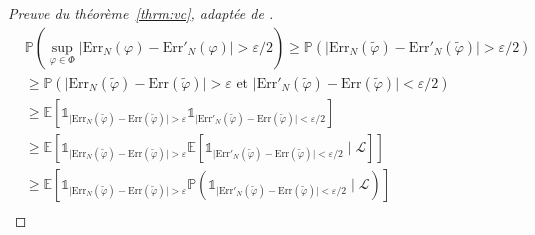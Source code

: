 \begin{proof}[Preuve du théorème~\ref{thrm:vc}, adaptée de \citet{Devroye1997}]
    \begin{align*}
        &\mathbb{P} \left( \sup_{\varphi \in \Phi} \vert \mathrm{Err}_N ( \varphi ) - \mathrm{Err}'_N (\varphi) \vert > \varepsilon/2 \right) \geq \mathbb{P} \left( \vert \mathrm{Err}_N ( \tilde{\varphi} ) - \mathrm{Err}'_N (\tilde{\varphi}) \vert > \varepsilon/2 \right) \\
        &\geq \mathbb{P} \left( \vert \mathrm{Err}_N ( \tilde{\varphi} ) - \mathrm{Err} (\tilde{\varphi}) \vert > \varepsilon \text{ et } \vert \mathrm{Err}'_N ( \tilde{\varphi} ) - \mathrm{Err} (\tilde{\varphi}) \vert < \varepsilon/2 \right) \\
        &\geq \mathbb{E} \left[ \mathds{1}_{\vert \mathrm{Err}_N ( \tilde{\varphi} ) - \mathrm{Err} (\tilde{\varphi}) \vert > \varepsilon} \mathds{1}_{\vert \mathrm{Err}'_N ( \tilde{\varphi} ) - \mathrm{Err} (\tilde{\varphi}) \vert < \varepsilon/2} \right] \\
        &\geq \mathbb{E} \left[ \mathds{1}_{\vert \mathrm{Err}_N ( \tilde{\varphi} ) - \mathrm{Err} (\tilde{\varphi}) \vert > \varepsilon} \mathbb{E} \left[ \mathds{1}_{\vert \mathrm{Err}'_N ( \tilde{\varphi} ) - \mathrm{Err} (\tilde{\varphi}) \vert < \varepsilon/2} \mid \mathcal{L} \right] \right] \\
        &\geq \mathbb{E} \left[ \mathds{1}_{\vert \mathrm{Err}_N ( \tilde{\varphi} ) - \mathrm{Err} (\tilde{\varphi}) \vert > \varepsilon} \mathbb{P} \left( \mathds{1}_{\vert \mathrm{Err}'_N ( \tilde{\varphi} ) - \mathrm{Err} (\tilde{\varphi}) \vert < \varepsilon/2} \mid \mathcal{L} \right) \right] \\
    \end{align*}
    

\end{proof}
